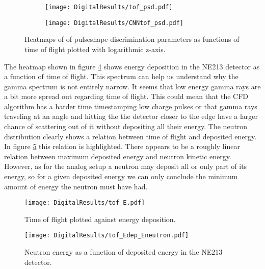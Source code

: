 \documentclass[main.tex]{subfiles}
\begin{document}
\begin{figure}
    \centering
    \begin{subfigure}[ht]{\textwidth}
        \texttt{[image: DigitalResults/tof\_psd.pdf]}
        \caption{}
        \label{fig:tof_digi_cc}
    \end{subfigure}
	\begin{subfigure}[ht]{\textwidth}
        \texttt{[image: DigitalResults/CNNtof\_psd.pdf]}
        \caption{}
        \label{fig:tof_digi_cnn}
    \end{subfigure}
    \caption{Heatmaps of of pulseshape discrimination parameters as functions of time of flight plotted with logarithmic z-axis.}
    \label{fig:tof_cc_tof_cnn}
\end{figure}

The heatmap shown in figure \ref{fig:tof_E_d} shows energy deposition in the NE213 detector as a function of time of flight. This spectrum can help us understand why the gamma spectrum is not entirely narrow. It seems that low energy gamma rays are a bit more spread out regarding time of flight. This could mean that the CFD algorithm has a harder time timestamping low charge pulses or that gamma rays traveling at an angle and hitting the the detector closer to the edge have a larger chance of scattering out of it without depositing all their energy. The neutron distribution clearly shows a relation between time of flight and deposited energy. In figure \ref{fig:tof_Edep_Eneutron_d} this relation is highlighted. There appears to be a roughly linear relation between maximum deposited energy and neutron kinetic energy. However, as for the analog setup a neutron may deposit all or only part of its energy, so for a given deposited energy we can only conclude the minimum amount of energy the neutron must have had.


\begin{figure}[ht]
    \centering
        \texttt{[image: DigitalResults/tof\_E.pdf]}
        \caption{Time of flight plotted against energy deposition.}
    \label{fig:tof_E_d} 
\end{figure}

\begin{figure}[ht]
    \centering
        \texttt{[image: DigitalResults/tof\_Edep\_Eneutron.pdf]}
        \caption{Neutron energy as a function of deposited energy in the NE213 detector.}
    \label{fig:tof_Edep_Eneutron_d} 
\end{figure}
\end{document}
